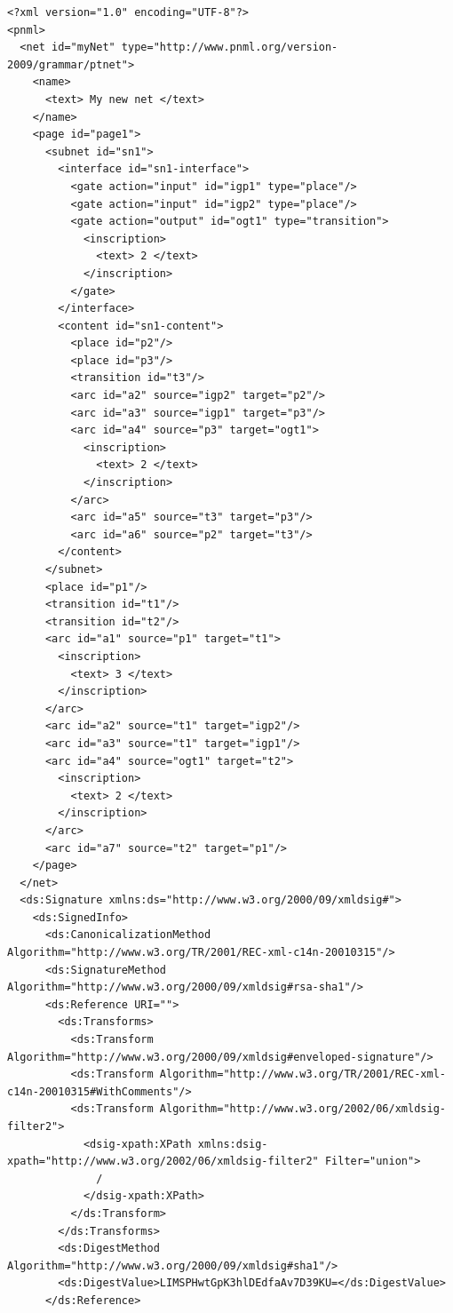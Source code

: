 \begin{lstlisting}[basicstyle=\ttfamily\tiny]
<?xml version="1.0" encoding="UTF-8"?>
<pnml>
  <net id="myNet" type="http://www.pnml.org/version-2009/grammar/ptnet">
    <name>
      <text> My new net </text>
    </name>
    <page id="page1">
      <subnet id="sn1">
        <interface id="sn1-interface">
          <gate action="input" id="igp1" type="place"/>
          <gate action="input" id="igp2" type="place"/>
          <gate action="output" id="ogt1" type="transition">
            <inscription>
              <text> 2 </text>
            </inscription>
          </gate>
        </interface>
        <content id="sn1-content">
          <place id="p2"/>
          <place id="p3"/>
          <transition id="t3"/>
          <arc id="a2" source="igp2" target="p2"/>
          <arc id="a3" source="igp1" target="p3"/>
          <arc id="a4" source="p3" target="ogt1">
            <inscription>
              <text> 2 </text>
            </inscription>
          </arc>
          <arc id="a5" source="t3" target="p3"/>
          <arc id="a6" source="p2" target="t3"/>
        </content>
      </subnet>
      <place id="p1"/>
      <transition id="t1"/>
      <transition id="t2"/>
      <arc id="a1" source="p1" target="t1">
        <inscription>
          <text> 3 </text>
        </inscription>
      </arc>
      <arc id="a2" source="t1" target="igp2"/>
      <arc id="a3" source="t1" target="igp1"/>
      <arc id="a4" source="ogt1" target="t2">
        <inscription>
          <text> 2 </text>
        </inscription>
      </arc>
      <arc id="a7" source="t2" target="p1"/>
    </page>
  </net>
  <ds:Signature xmlns:ds="http://www.w3.org/2000/09/xmldsig#">
    <ds:SignedInfo>
      <ds:CanonicalizationMethod Algorithm="http://www.w3.org/TR/2001/REC-xml-c14n-20010315"/>
      <ds:SignatureMethod Algorithm="http://www.w3.org/2000/09/xmldsig#rsa-sha1"/>
      <ds:Reference URI="">
        <ds:Transforms>
          <ds:Transform Algorithm="http://www.w3.org/2000/09/xmldsig#enveloped-signature"/>
          <ds:Transform Algorithm="http://www.w3.org/TR/2001/REC-xml-c14n-20010315#WithComments"/>
          <ds:Transform Algorithm="http://www.w3.org/2002/06/xmldsig-filter2">
            <dsig-xpath:XPath xmlns:dsig-xpath="http://www.w3.org/2002/06/xmldsig-filter2" Filter="union">
              /
            </dsig-xpath:XPath>
          </ds:Transform>
        </ds:Transforms>
        <ds:DigestMethod Algorithm="http://www.w3.org/2000/09/xmldsig#sha1"/>
        <ds:DigestValue>LIMSPHwtGpK3hlDEdfaAv7D39KU=</ds:DigestValue>
      </ds:Reference>

\end{lstlisting}
